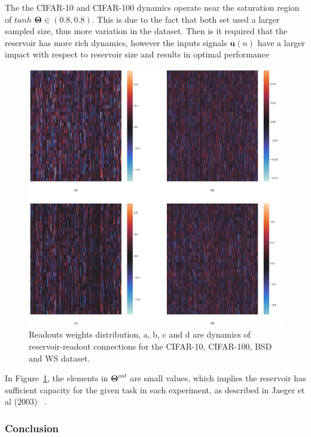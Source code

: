 \documentclass{WitsPhysicsReport}
\begin{document}
The the CIFAR-10 and CIFAR-100 dynamics operate near the saturation region of $tanh$  ${\mathbf{\Theta}} \in(0.8, 0.8)$. This is due to the fact that both set used a larger sampled size, thus more variation in the dataset. Then is it required that the reservoir has more rich dynamics, however the inputs signals $\mathbf{u}(n)$ have a larger impact with respect to reservoir size and results in optimal performance~\cite{jaeger2002tutorial}

\begin{figure}[H]
\centering
  \includegraphics[width=1\textwidth]{Figure/Results/Reservoir_activity_Readout_weights_activity_.png}
 \caption{Readouts weights distribution, a, b, c and d are dynamics of reservoir-readout connections for the CIFAR-10, CIFAR-100, BSD and WS dataset.}
 \label{fig:readout_activity}
\end{figure}


In Figure~\ref{fig:readout_activity}, the elements in ${\mathbf{\Theta}}^{out}$ are small values, which implies the reservoir has sufficient capacity for the given task in each experiment, as described in Jaeger et al (2003) ~\citep{jaeger2002tutorial}. 

\subsubsection{Conclusion}
\end{document}
